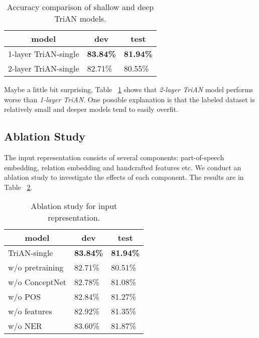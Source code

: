 \documentclass[11pt,a4paper]{article}
\begin{document}
\begin{table}[ht]
\centering
\begin{tabular}{l|ll}
 \hline
\multicolumn{1}{c|}{model} & \multicolumn{1}{c}{dev} & \multicolumn{1}{c}{test} \\ \hline
1-layer TriAN-single       & \textbf{83.84\%}  &  \textbf{81.94\%}  \\ \hline
2-layer TriAN-single       & 82.71\%    & 80.55\%  \\ \hline
\end{tabular}
\caption{Accuracy comparison of shallow and deep TriAN models.}
\label{table:layers}
\end{table}

Maybe a little bit surprising,
Table ~\ref{table:layers} shows that
\emph{2-layer TriAN} model performs worse than \emph{1-layer TriAN}.
One possible explanation is that
the labeled dataset is relatively small
and deeper models tend to easily overfit.

\subsection{Ablation Study} \label{section:ablation}

The input representation consists of several components:
part-of-speech embedding,
relation embedding
and handcrafted features etc.
We conduct an ablation study to investigate the effects of each component.
The results are in Table ~\ref{table:input_ablation}.

\begin{table}[ht]
\centering
\begin{tabular}{l|ll}
 \hline
\multicolumn{1}{c|}{model}     & \multicolumn{1}{c}{dev} & \multicolumn{1}{c}{test} \\ \hline
TriAN-single    & \textbf{83.84\%}   & \textbf{81.94\%}  \\ \hline \hline
w/o pretraining & 82.71\%   & 80.51\%  \\ \hline
w/o ConceptNet  & 82.78\%   & 81.08\%    \\ \hline
w/o POS         & 82.84\%   & 81.27\%    \\ \hline
w/o features    & 82.92\%   & 81.35\% \\ \hline
w/o NER         & 83.60\%   & 81.87\%    \\ \hline
\end{tabular}
\caption{Ablation study for input representation.}
\label{table:input_ablation}
\end{table}
\end{document}
